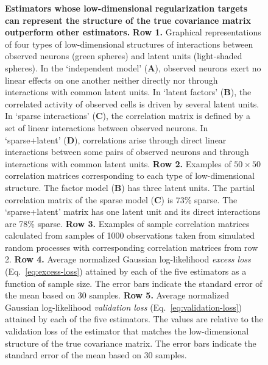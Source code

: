 \documentclass[10pt]{article}
\begin{document}
\begin{figure}[!ht]
    \begin{center}
    \end{center}
    \caption{{\bf Estimators whose low-dimensional regularization targets can represent the structure of the true covariance matrix outperform other estimators.}
        {\bf Row 1.} Graphical representations of four types of low-dimensional structures of interactions between observed neurons (green spheres) and latent units (light-shaded spheres).
        In the `independent model' ({\bf A}), observed neurons exert no linear effects on one another neither directly nor through interactions with common latent units. 
        In `latent factors' ({\bf B}), the correlated activity of observed cells is driven by several latent units. 
        In `sparse interactions' ({\bf C}), the correlation matrix is defined by a set of linear interactions between observed neurons. 
        In `sparse+latent' ({\bf D}), correlations arise through direct linear interactions between some pairs of observed neurons and through interactions with common latent units. 
        {\bf Row 2.} Examples of $50\times 50$ correlation matrices corresponding to each type of low-dimensional structure. 
        The factor model ({\bf B}) has three latent units. 
        The partial correlation matrix of the sparse model ({\bf C}) is 73\% sparse.
        The `sparse+latent' matrix has one latent unit and its direct interactions are 78\% sparse.
        {\bf Row 3.} Examples of sample correlation matrices calculated from samples of 1000 observations taken from simulated random processes with corresponding correlation matrices from row 2.
        {\bf Row 4.} Average normalized Gaussian log-likelihood \emph{excess loss} (Eq.~\ref{eq:excess-loss}) attained by each of the five estimators as a function of sample size. The error bars indicate the standard error of the mean based on 30 samples.
        {\bf Row 5.} Average normalized Gaussian log-likelihood \emph{validation loss} (Eq.~\ref{eq:validation-loss}) attained by each of the five estimators. The values are relative to the validation loss of the estimator that matches the low-dimensional structure of the true covariance matrix. The error bars indicate the standard error of the mean based on 30 samples.
    }
    \label{fig:02}
\end{figure} 
\end{document}
